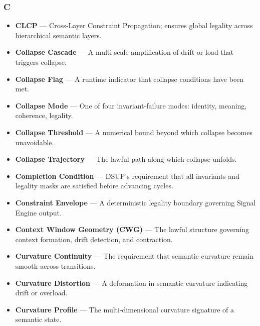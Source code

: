 \subsubsection*{C}
\begin{itemize}
    \item \textbf{CLCP} — Cross‑Layer Constraint Propagation; ensures global
    legality across hierarchical semantic layers.

    \item \textbf{Collapse Cascade} — A multi‑scale amplification of drift or
    load that triggers collapse.

    \item \textbf{Collapse Flag} — A runtime indicator that collapse conditions
    have been met.

    \item \textbf{Collapse Mode} — One of four invariant‑failure modes:
    identity, meaning, coherence, legality.

    \item \textbf{Collapse Threshold} — A numerical bound beyond which collapse
    becomes unavoidable.

    \item \textbf{Collapse Trajectory} — The lawful path along which collapse
    unfolds.

    \item \textbf{Completion Condition} — DSUP’s requirement that all invariants
    and legality masks are satisfied before advancing cycles.

    \item \textbf{Constraint Envelope} — A deterministic legality boundary
    governing Signal Engine output.

    \item \textbf{Context Window Geometry (CWG)} — The lawful structure governing
    context formation, drift detection, and contraction.

    \item \textbf{Curvature Continuity} — The requirement that semantic curvature
    remain smooth across transitions.

    \item \textbf{Curvature Distortion} — A deformation in semantic curvature
    indicating drift or overload.

    \item \textbf{Curvature Profile} — The multi‑dimensional curvature signature
    of a semantic state.
\end{itemize}


